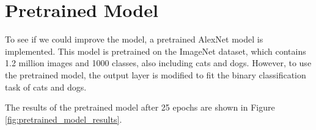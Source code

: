 \section{Pretrained Model}
To see if we could improve the model, a pretrained AlexNet model is implemented.
This model is pretrained on the ImageNet dataset, which contains 1.2 million images and 1000 classes, also including cats and dogs.
However, to use the pretrained model, the output layer is modified to fit the binary classification task of cats and dogs.

The results of the pretrained model after 25 epochs are shown in Figure \ref{fig:pretrained_model_results}.

